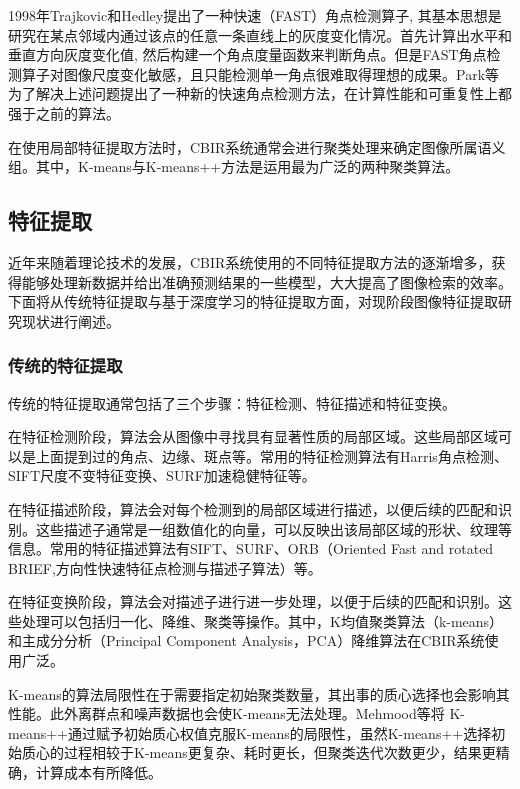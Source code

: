 \documentclass[bachelor_p]{hdu-thesis}
\begin{document}
1998年Trajkovic和Hedley\citep{FAST}提出了一种快速（FAST）角点检测算子, 其基本思想是研究在某点邻域内通过该点的任意一条直线上的灰度变化情况。首先计算出水平和垂直方向灰度变化值, 然后构建一个角点度量函数来判断角点。但是FAST角点检测算子对图像尺度变化敏感，且只能检测单一角点很难取得理想的成果。Park等\citep{PARK}为了解决上述问题提出了一种新的快速角点检测方法，在计算性能和可重复性上都强于之前的算法。

在使用局部特征提取方法时，CBIR系统通常会进行聚类处理来确定图像所属语义组。其中，K-means\citep{KMEANS}与K-means++\citep{KMEANS++}方法是运用最为广泛的两种聚类算法。

\subsection{特征提取}

近年来随着理论技术的发展，CBIR系统使用的不同特征提取方法的逐渐增多，获得能够处理新数据并给出准确预测结果的一些模型，大大提高了图像检索的效率。下面将从传统特征提取与基于深度学习的特征提取方面，对现阶段图像特征提取研究现状进行阐述。

\subsubsection{传统的特征提取}

传统的特征提取通常包括了三个步骤：特征检测、特征描述和特征变换。

在特征检测阶段，算法会从图像中寻找具有显著性质的局部区域。这些局部区域可以是上面提到过的角点、边缘、斑点等。常用的特征检测算法有Harris角点检测\citep{HARRIS}、SIFT\citep{SIFT}尺度不变特征变换、SURF\citep{SURF}加速稳健特征等。

在特征描述阶段，算法会对每个检测到的局部区域进行描述，以便后续的匹配和识别。这些描述子通常是一组数值化的向量，可以反映出该局部区域的形状、纹理等信息。常用的特征描述算法有SIFT\citep{SIFT}、SURF\citep{SURF}、ORB（Oriented Fast and rotated BRIEF,方向性快速特征点检测与描述子算法）等。

在特征变换阶段，算法会对描述子进行进一步处理，以便于后续的匹配和识别。这些处理可以包括归一化、降维、聚类等操作。其中，K均值聚类算法（k-means）和主成分分析（Principal Component Analysis，PCA）降维算法在CBIR系统使用广泛\citep{CBIRSHORT}。

K-means的算法局限性在于需要指定初始聚类数量，其出事的质心选择也会影响其性能。此外离群点和噪声数据也会使K-means无法处理。Mehmood等\citep{MEHMOOD}将 K-means++通过赋予初始质心权值克服K-means的局限性，虽然K-means++选择初始质心的过程相较于K-means更复杂、耗时更长，但聚类迭代次数更少，结果更精确，计算成本有所降低\citep{CBIRSHORT}。
\end{document}
